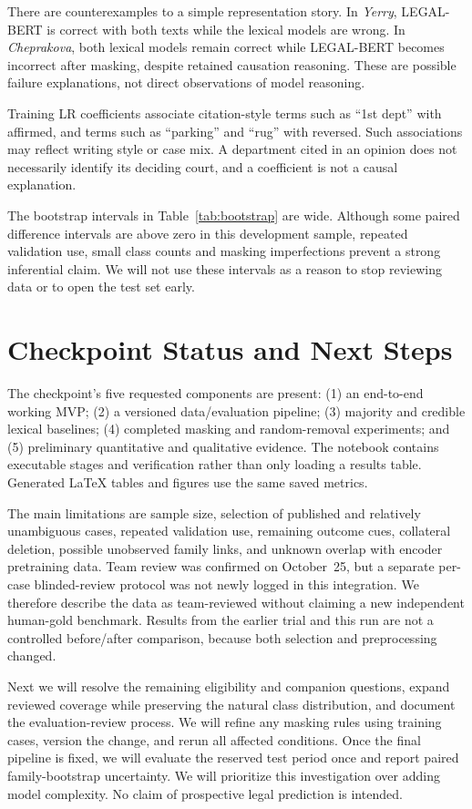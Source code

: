 \documentclass[conference]{IEEEtran}
\begin{document}
There are counterexamples to a simple representation story. In \emph{Yerry}, LEGAL-BERT is correct with both texts while the lexical models are wrong. In \emph{Cheprakova}, both lexical models remain correct while LEGAL-BERT becomes incorrect after masking, despite retained causation reasoning. These are possible failure explanations, not direct observations of model reasoning.

Training LR coefficients associate citation-style terms such as ``1st dept'' with affirmed, and terms such as ``parking'' and ``rug'' with reversed. Such associations may reflect writing style or case mix. A department cited in an opinion does not necessarily identify its deciding court, and a coefficient is not a causal explanation.


The bootstrap intervals in Table~\ref{tab:bootstrap} are wide. Although some paired difference intervals are above zero in this development sample, repeated validation use, small class counts and masking imperfections prevent a strong inferential claim. We will not use these intervals as a reason to stop reviewing data or to open the test set early.

\section{Checkpoint Status and Next Steps}
The checkpoint's five requested components are present: (1) an end-to-end working MVP; (2) a versioned data/evaluation pipeline; (3) majority and credible lexical baselines; (4) completed masking and random-removal experiments; and (5) preliminary quantitative and qualitative evidence. The notebook contains executable stages and verification rather than only loading a results table. Generated LaTeX tables and figures use the same saved metrics.

The main limitations are sample size, selection of published and relatively unambiguous cases, repeated validation use, remaining outcome cues, collateral deletion, possible unobserved family links, and unknown overlap with encoder pretraining data. Team review was confirmed on October~25, but a separate per-case blinded-review protocol was not newly logged in this integration. We therefore describe the data as team-reviewed without claiming a new independent human-gold benchmark. Results from the earlier trial and this run are not a controlled before/after comparison, because both selection and preprocessing changed.

Next we will resolve the remaining eligibility and companion questions, expand reviewed coverage while preserving the natural class distribution, and document the evaluation-review process. We will refine any masking rules using training cases, version the change, and rerun all affected conditions. Once the final pipeline is fixed, we will evaluate the reserved test period once and report paired family-bootstrap uncertainty. We will prioritize this investigation over adding model complexity. No claim of prospective legal prediction is intended.
\end{document}
